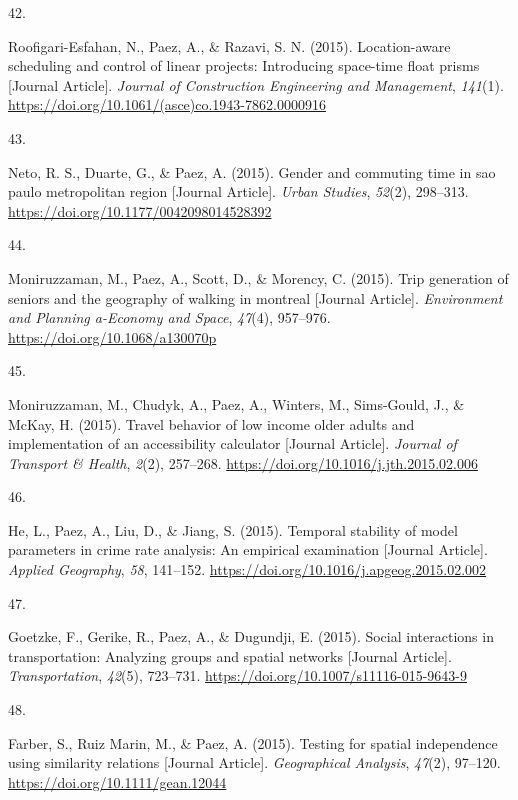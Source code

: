 \documentclass[10pt,a4paper,]{twentysecondcv}
\newlength{\csllabelwidth}
\newcommand{\CSLLeftMargin}[1]{\parbox[t]{\csllabelwidth}{#1}}
\newcommand{\CSLRightInline}[1]{\parbox[t]{\linewidth - \csllabelwidth}{#1}}
\begin{document}
\leavevmode{}%
\CSLLeftMargin{42. }%
\CSLRightInline{Roofigari-Esfahan, N., Paez, A., \& Razavi, S. N.
(2015). Location-aware scheduling and control of linear projects:
Introducing space-time float prisms {[}Journal Article{]}. \emph{Journal
of Construction Engineering and Management}, \emph{141}(1).
\url{https://doi.org/10.1061/(asce)co.1943-7862.0000916}}

\leavevmode{}%
\CSLLeftMargin{43. }%
\CSLRightInline{Neto, R. S., Duarte, G., \& Paez, A. (2015). Gender and
commuting time in sao paulo metropolitan region {[}Journal Article{]}.
\emph{Urban Studies}, \emph{52}(2), 298--313.
\url{https://doi.org/10.1177/0042098014528392}}

\leavevmode{}%
\CSLLeftMargin{44. }%
\CSLRightInline{Moniruzzaman, M., Paez, A., Scott, D., \& Morency, C.
(2015). Trip generation of seniors and the geography of walking in
montreal {[}Journal Article{]}. \emph{Environment and Planning a-Economy
and Space}, \emph{47}(4), 957--976.
\url{https://doi.org/10.1068/a130070p}}

\leavevmode{}%
\CSLLeftMargin{45. }%
\CSLRightInline{Moniruzzaman, M., Chudyk, A., Paez, A., Winters, M.,
Sims-Gould, J., \& McKay, H. (2015). Travel behavior of low income older
adults and implementation of an accessibility calculator {[}Journal
Article{]}. \emph{Journal of Transport \& Health}, \emph{2}(2),
257--268. \url{https://doi.org/10.1016/j.jth.2015.02.006}}

\leavevmode{}%
\CSLLeftMargin{46. }%
\CSLRightInline{He, L., Paez, A., Liu, D., \& Jiang, S. (2015). Temporal
stability of model parameters in crime rate analysis: An empirical
examination {[}Journal Article{]}. \emph{Applied Geography}, \emph{58},
141--152. \url{https://doi.org/10.1016/j.apgeog.2015.02.002}}

\leavevmode{}%
\CSLLeftMargin{47. }%
\CSLRightInline{Goetzke, F., Gerike, R., Paez, A., \& Dugundji, E.
(2015). Social interactions in transportation: Analyzing groups and
spatial networks {[}Journal Article{]}. \emph{Transportation},
\emph{42}(5), 723--731. \url{https://doi.org/10.1007/s11116-015-9643-9}}

\leavevmode{}%
\CSLLeftMargin{48. }%
\CSLRightInline{Farber, S., Ruiz Marin, M., \& Paez, A. (2015). Testing
for spatial independence using similarity relations {[}Journal
Article{]}. \emph{Geographical Analysis}, \emph{47}(2), 97--120.
\url{https://doi.org/10.1111/gean.12044}}
\end{document}
